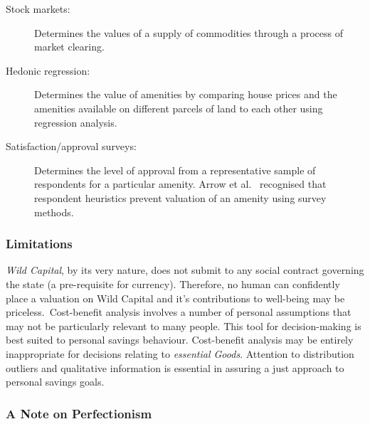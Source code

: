 \documentclass[11pt, oneside]{article}   	%
\begin{document}
\begin{description}
\item[Stock markets:] Determines the values of a supply of commodities through a process of market clearing.
\item[Hedonic regression:] Determines the value of amenities by comparing house prices and the amenities available on different parcels of land to each other using regression analysis.
\item[Satisfaction/approval surveys:] Determines the level of approval from a representative sample of respondents for a particular amenity. Arrow et al.~\cite{kja1} recognised that respondent heuristics prevent valuation of an amenity using survey methods.
\end{description}

\subsubsection{Limitations}

\emph{Wild Capital}, by its very nature, does not submit to any social contract governing the state (a pre-requisite for currency).
Therefore, no human can confidently place a valuation on Wild Capital and it's contributions to well-being may be priceless.\
Cost-benefit analysis involves a number of personal assumptions that may not be particularly relevant to many people. This tool for decision-making is best suited to personal savings behaviour.
Cost-benefit analysis may be entirely inappropriate for decisions relating to \emph{essential Goods}.
Attention to distribution outliers and qualitative information is essential in assuring a just approach to personal savings goals.

\subsubsection{A Note on Perfectionism}
\end{document}
